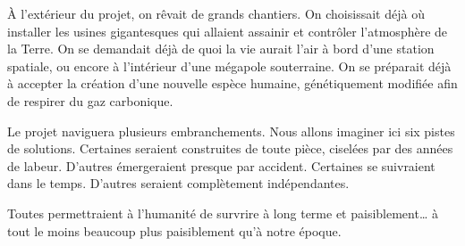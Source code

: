 À l'extérieur du projet, on rêvait de grands chantiers.  On choisissait
déjà où installer les usines gigantesques qui allaient assainir et
contrô\-ler l'at\-mosphère de la Terre. On se demandait déjà de quoi la vie
aurait l'air à bord d'une station spatiale, ou encore à l'intérieur d'une
mégapole souterraine. On se préparait déjà à accepter la création d'une
nouvelle espèce humaine, génétiquement modifiée afin de respirer du gaz
carbo\-nique.

Le projet \nomProjet{} naviguera plusieurs embranchements.  Nous allons
imaginer ici six pistes de solutions.  Certaines seraient construites de toute
pièce, ciselées par des années de labeur.  D'autres émergeraient presque par
accident.  Certaines se suivraient dans le temps. D'autres seraient
complètement indépendantes. 

Toutes permettraient à l'humanité de survrire à long terme et paisiblement\ldots{} à tout le moins beaucoup 
plus paisiblement qu'à notre époque.
